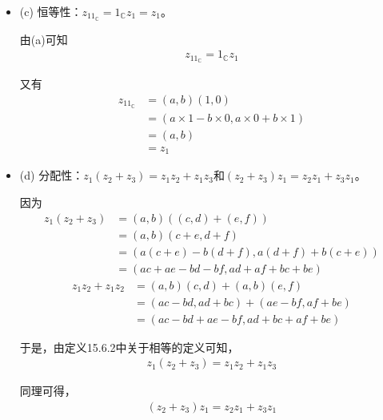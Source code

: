 \documentclass{article}
\begin{document}
\begin{itemize}
  \item (c) 恒等性：$z_11_\mathbb{C} = 1_\mathbb{C}z_1 = z_1$。

        由(a)可知
        \begin{align*}
          z_11_\mathbb{C} = 1_\mathbb{C}z_1
        \end{align*}

        又有
        \begin{align*}
          z_11_\mathbb{C} & = (a, b)(1, 0)                                    \\
                          & = (a\times 1 - b \times 0, a\times 0 + b\times 1) \\
                          & = (a, b)                                          \\
                          & = z_1
        \end{align*}

  \item (d) 分配性：$z_1(z_2 + z_3) = z_1z_2 + z_1z_3$和$(z_2 + z_3)z_1 = z_2z_1 + z_3z_1$。

        因为
        \begin{align*}
          z_1(z_2 + z_3) & = (a, b)((c, d) + (e, f))                    \\
                         & = (a, b)(c + e, d + f)                       \\
                         & = (a(c + e) - b(d + f), a(d + f) + b(c + e)) \\
                         & = (ac + ae - bd - bf, ad + af + bc + be)
        \end{align*}
        \begin{align*}
          z_1z_2 + z_1z_2 & = (a, b)(c, d) + (a, b)(e, f)             \\
                          & = (ac - bd, ad + bc) + (ae - bf, af + be) \\
                          & = (ac - bd + ae - bf, ad + bc + af + be)
        \end{align*}

        于是，由定义15.6.2中关于相等的定义可知，
        \begin{align*}
          z_1(z_2 + z_3) = z_1z_2 + z_1z_3
        \end{align*}

        同理可得，
        \begin{align*}
          (z_2 + z_3)z_1 = z_2z_1 + z_3z_1
        \end{align*}

\end{itemize}
\end{document}

